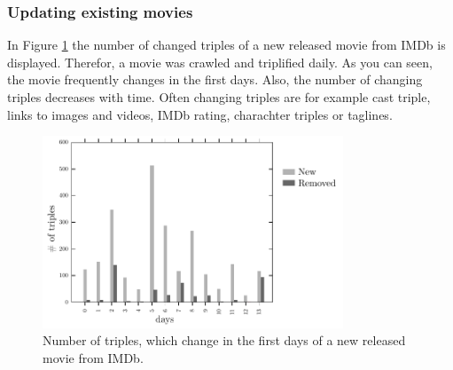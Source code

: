 \subsubsection{Updating existing movies}
In Figure \ref{fig_new_movie} the number of changed triples of a new released movie from IMDb is displayed.
Therefor, a movie was crawled and triplified daily.
As you can seen, the movie frequently changes in the first days.
Also, the number of changing triples decreases with time.
Often changing triples are for example cast triple, links to images and videos, IMDb rating, charachter triples or taglines.

\begin{figure}[h!]
  \begin{center}
  \includegraphics[width=0.8\textwidth]{images/updating_2.pdf}
  \end{center}
  \caption{Number of triples, which change in the first days of a new released movie from IMDb.}
  \label{fig_new_movie}
\end{figure}

